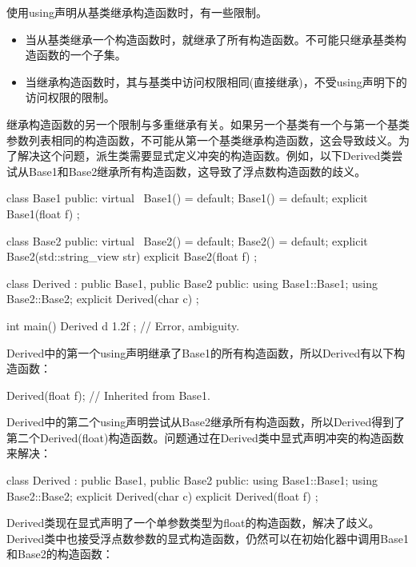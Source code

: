 使用using声明从基类继承构造函数时，有一些限制。

\begin{itemize}
\item
当从基类继承一个构造函数时，就继承了所有构造函数。不可能只继承基类构造函数的一个子集。

\item
当继承构造函数时，其与基类中访问权限相同(直接继承)，不受using声明下的访问权限的限制。
\end{itemize}


继承构造函数的另一个限制与多重继承有关。如果另一个基类有一个与第一个基类参数列表相同的构造函数，不可能从第一个基类继承构造函数，这会导致歧义。为了解决这个问题，派生类需要显式定义冲突的构造函数。例如，以下Derived类尝试从Base1和Base2继承所有构造函数，这导致了浮点数构造函数的歧义。

\begin{cpp}
class Base1
{
    public:
        virtual ~Base1() = default;
        Base1() = default;
        explicit Base1(float f) {}
};

class Base2
{
    public:
        virtual ~Base2() = default;
        Base2() = default;
        explicit Base2(std::string_view str) {}
        explicit Base2(float f) {}
};

class Derived : public Base1, public Base2
{
    public:
        using Base1::Base1;
        using Base2::Base2;
        explicit Derived(char c) {}
};

int main()
{
    Derived d { 1.2f }; // Error, ambiguity.
}
\end{cpp}

Derived中的第一个using声明继承了Base1的所有构造函数，所以Derived有以下构造函数：

\begin{cpp}
Derived(float f); // Inherited from Base1.
\end{cpp}

Derived中的第二个using声明尝试从Base2继承所有构造函数，所以Derived得到了第二个Derived(float)构造函数。问题通过在Derived类中显式声明冲突的构造函数来解决：

\begin{cpp}
class Derived : public Base1, public Base2
{
    public:
        using Base1::Base1;
        using Base2::Base2;
        explicit Derived(char c) {}
        explicit Derived(float f) {}
};
\end{cpp}

Derived类现在显式声明了一个单参数类型为float的构造函数，解决了歧义。Derived类中也接受浮点数参数的显式构造函数，仍然可以在初始化器中调用Base1和Base2的构造函数：

